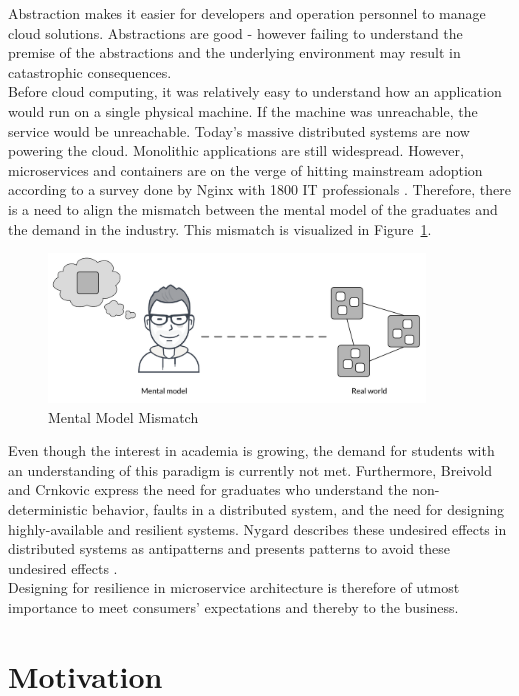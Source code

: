 \noindent
Abstraction makes it easier for developers and operation personnel to manage cloud solutions. Abstractions are good - however failing to understand the premise of the abstractions and the underlying environment may result in catastrophic consequences.  \\

\noindent
Before cloud computing, it was relatively easy to understand how an application would run on a single physical machine. If the machine was unreachable, the service would be unreachable. Today's massive distributed systems are now powering the cloud. Monolithic applications are still widespread. However, microservices and containers are on the verge of hitting mainstream adoption according to a survey done by Nginx with 1800 IT professionals \cite{nginx2016future}. Therefore, there is a need to align the mismatch between the mental model of the graduates and the demand in the industry. This mismatch is visualized in Figure~\ref{fig:mental_model_present}.

\begin{figure}[H]
	\centering
	\includegraphics[width=10cm]{figures/present_mental_model}
	\caption{Mental Model Mismatch}
	\label{fig:mental_model_present}
\end{figure}

\noindent
Even though the interest in academia is growing, the demand for students with an understanding of this paradigm is currently not met. Furthermore, Breivold and Crnkovic express the need for graduates who understand the non-deterministic behavior, faults in a distributed system, and the need for designing highly-available and resilient systems. Nygard describes these undesired effects in distributed systems as antipatterns and presents patterns to avoid these undesired effects \cite[p. 31-114]{nygard2007release}. \\

\noindent
Designing for resilience in microservice architecture is therefore of utmost importance to meet consumers' expectations and thereby to the business.


\section{Motivation}


